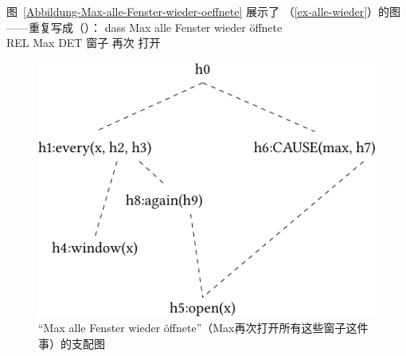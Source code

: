 图~\vref{Abbildung-Max-alle-Fenster-wieder-oeffnete} 展示了 （\ref{ex-alle-wieder}）的图——重复写成（）：
\ea
\label{ex-alle-wieder-zwei}
\gll dass Max alle Fenster wieder öffnete\\
	 REL Max DET 窗子 再次 打开\\
\z
\begin{figure}
\centering
\includegraphics{Figures/mrs-max-alle-fenster-wieder-oeffnete-cropped.pdf}
\caption{“Max alle Fenster wieder öffnete”（Max再次打开所有这些窗子这件事）的支配图\label{Abbildung-Max-alle-Fenster-wieder-oeffnete}}
\end{figure}%

